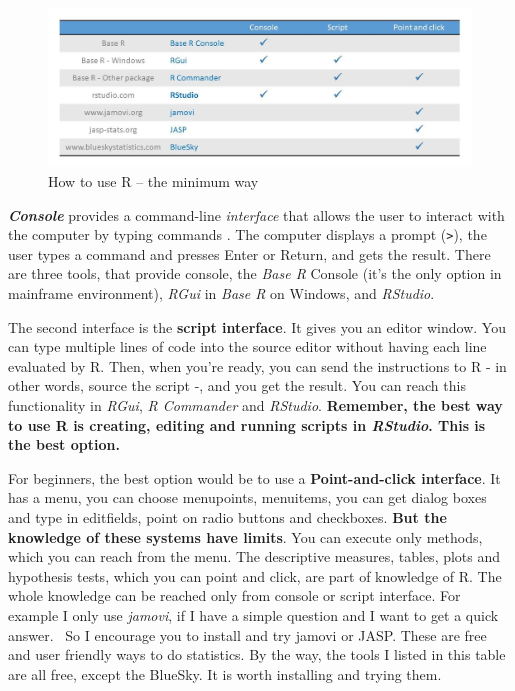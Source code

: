 \documentclass[
]{book}
\begin{document}
\begin{figure}

{\centering \includegraphics[width=0.9\linewidth]{img/baser_rstudio_all} 

}

\caption{How to use R – the minimum way}\label{fig:unnamed-chunk-4}
\end{figure}

\textbf{\emph{Console}} provides a command-line \emph{interface} that allows the user
to interact with the computer by typing commands . The computer displays
a prompt (\texttt{\textgreater{}}), the user types a command and presses Enter or
Return, and gets the result. There are three tools, that
provide console, the \emph{Base R} Console (it's the only option in mainframe
environment), \emph{RGui} in \emph{Base R} on Windows, and \emph{RStudio}.

The second interface is the \textbf{script interface}. It gives you an editor
window. You can type multiple lines of code into the source editor
without having each line evaluated by R. Then, when you're ready, you
can send the instructions to R - in other words, source the script -,
and you get the result. You can reach this functionality in \emph{RGui}, \emph{R
Commander} and \emph{RStudio}. \textbf{Remember, the best way to use R is creating,
editing and running scripts in \emph{RStudio}. This is the best option.}

For beginners, the best option would be to use a \textbf{Point-and-click
interface}. It has a menu, you can choose menupoints, menuitems, you
can get dialog boxes and type in editfields, point on radio buttons and
checkboxes. \textbf{But the knowledge of these systems have limits}. You can
execute only methods, which you can reach from the menu. The descriptive
measures, tables, plots and hypothesis tests, which you can point and
click, are part of knowledge of R. The whole knowledge can be reached
only from console or script interface. For example I only use \emph{jamovi},
if I have a simple question and I want to get a quick answer. ~So I
encourage you to install and try jamovi or JASP. These are free and user
friendly ways to do statistics. By the way, the tools I listed in this
table are all free, except the BlueSky. It is worth installing and
trying them.
\end{document}
